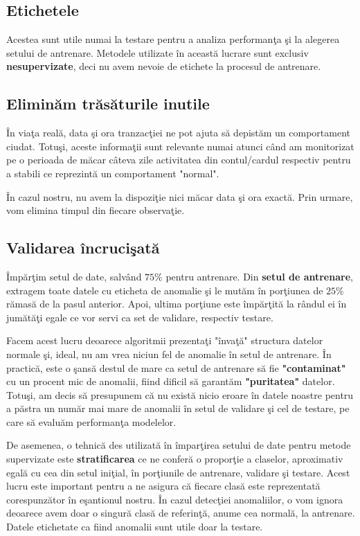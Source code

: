 \subsection{Etichetele}

Acestea sunt utile numai la testare pentru a analiza 
performanţa şi la alegerea setului de antrenare. Metodele utilizate în această lucrare
sunt exclusiv \textbf{nesupervizate}, deci nu avem nevoie de etichete la procesul de antrenare.

\subsection{Eliminăm trăsăturile inutile}

În viaţa reală, data şi ora tranzacţiei ne pot ajuta să depistăm un comportament 
ciudat. Totuşi, aceste informaţii sunt relevante numai atunci când am monitorizat
pe o perioada de măcar câteva zile activitatea din contul/cardul respectiv pentru a 
stabili ce reprezintă un comportament "normal".

În cazul nostru, nu avem la dispoziţie nici măcar data şi ora exactă. Prin urmare, vom
elimina timpul din fiecare observaţie.

\subsection{Validarea încrucişată}

Împărţim setul de date, salvând $75\%$ pentru antrenare. Din \textbf{setul de antrenare}, 
extragem toate
datele cu eticheta de anomalie şi le mutăm în porţiunea de $25\%$ rămasă de la pasul anterior.
Apoi, ultima porţiune este împărţită la rândul ei în jumătăţi egale ce vor servi ca set de validare, respectiv testare.

Facem acest lucru deoarece algoritmii prezentaţi "învaţă" structura datelor normale şi, ideal,
nu am vrea niciun fel de anomalie în setul de antrenare. În practică, este o şansă destul de 
mare ca setul de antrenare să fie \textbf{"contaminat"} cu un procent mic de anomalii, fiind dificil 
să garantăm \textbf{"puritatea"} datelor. Totuşi, am decis să presupunem că nu există nicio eroare 
în datele noastre pentru a păstra un număr mai mare de anomalii în setul de validare şi cel de 
testare, pe care să evaluăm performanţa modelelor.

De asemenea, o tehnică des utilizată în împarţirea setului de date pentru metode supervizate 
este \textbf{stratificarea} ce ne conferă o proporţie a claselor, aproximativ egală cu 
cea din setul iniţial, în porţiunile
de antrenare, validare şi testare. Acest lucru este important pentru a ne asigura că fiecare 
clasă este reprezentată corespunzător în eşantionul nostru. În cazul detecţiei anomaliilor, 
o vom ignora deoarece avem doar o singură clasă de referinţă, anume cea normală, la antrenare. 
Datele etichetate ca fiind anomalii sunt utile doar la testare.

